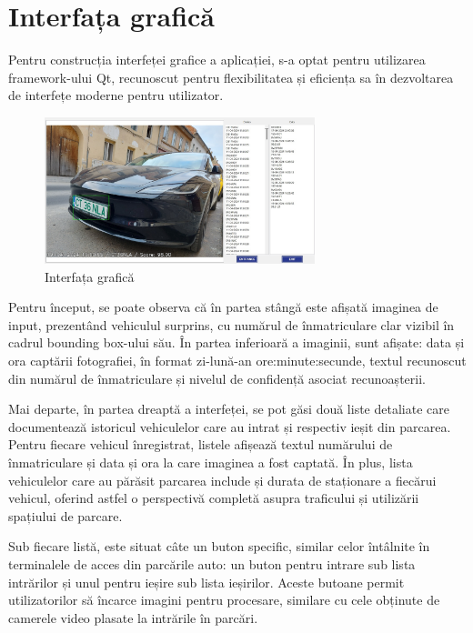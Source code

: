 \documentclass[a4paper,12pt]{report}
\begin{document}
\section{Interfața grafică}
Pentru construcția interfeței grafice a aplicației, s-a optat pentru utilizarea framework-ului Qt, recunoscut pentru flexibilitatea și eficiența sa în dezvoltarea de interfețe moderne pentru utilizator.

\begin{figure}[h]
    \centering
    \includegraphics[width=0.7\textwidth]{images/gui.jpg}
    \caption{Interfața grafică}
\end{figure}
\FloatBarrier

Pentru început, se poate observa că în partea stângă este afișată imaginea de input, prezentând vehiculul surprins, cu numărul de înmatriculare clar vizibil în cadrul bounding box-ului său. În partea inferioară a imaginii, sunt afișate: data și ora captării fotografiei, în format zi-lună-an ore:minute:secunde, textul recunoscut din numărul de înmatriculare și nivelul de confidență asociat recunoașterii.

Mai departe, în partea dreaptă a interfeței, se pot găsi două liste detaliate care documentează istoricul vehiculelor care au intrat și respectiv ieșit din parcarea. Pentru fiecare vehicul înregistrat, listele afișează textul numărului de înmatriculare și data și ora la care imaginea a fost captată. În plus, lista vehiculelor care au părăsit parcarea include și durata de staționare a fiecărui vehicul, oferind astfel o perspectivă completă asupra traficului și utilizării spațiului de parcare.

Sub fiecare listă, este situat câte un buton specific, similar celor întâlnite în terminalele de acces din parcările auto: un buton pentru intrare sub lista intrărilor și unul pentru ieșire sub lista ieșirilor. Aceste butoane permit utilizatorilor să încarce imagini pentru procesare, similare cu cele obținute de camerele video plasate la intrările în parcări.
\end{document}
